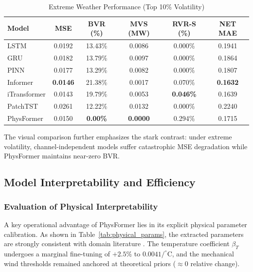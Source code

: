 \begin{table}[htbp]
\centering
\caption{Extreme Weather Performance (Top 10\% Volatility)}
\label{tab:extreme_results}
\footnotesize
\setlength{\tabcolsep}{2pt}
\begin{tabular*}{\columnwidth}{@{\extracolsep{\fill}}lccccc@{}}
\toprule
Model & MSE & BVR (\%) & MVS (MW) & RVR-S (\%) & NET MAE \\
\midrule
LSTM & 0.0192 & 13.43\% & 0.0086 & 0.000\% & 0.1941 \\
GRU & 0.0182 & 13.79\% & 0.0097 & 0.000\% & 0.1864 \\
PINN & 0.0177 & 13.29\% & 0.0082 & 0.000\% & 0.1807 \\
Informer & \textbf{0.0146} & 21.38\% & 0.0017 & 0.070\% & \textbf{0.1632} \\
iTransformer & 0.0143 & 19.79\% & 0.0053 & \textbf{0.046\%} & 0.1639 \\
PatchTST & 0.0261 & 12.22\% & 0.0132 & 0.000\% & 0.2240 \\
PhysFormer & 0.0150 & \textbf{0.00\%} & \textbf{0.0000} & 0.294\% & 0.1715 \\
\bottomrule
\end{tabular*}
\end{table}

The visual comparison further emphasizes the stark contrast: under extreme volatility, channel-independent models suffer catastrophic MSE degradation while PhysFormer maintains near-zero BVR.

\subsection{Model Interpretability and Efficiency}
\label{subsec:mechanism}

\subsubsection{Evaluation of Physical Interpretability}
\label{subsubsec:interpretability}

A key operational advantage of PhysFormer lies in its explicit physical parameter calibration. As shown in Table~\ref{tab:physical_params}, the extracted parameters are strongly consistent with domain literature \cite{Li2026,Asinyo2025}. The temperature coefficient $\beta_T$ undergoes a marginal fine-tuning of $+2.5\%$ to $0.0041/^\circ$C, and the mechanical wind thresholds remained anchored at theoretical priors ($\approx 0$ relative change).

